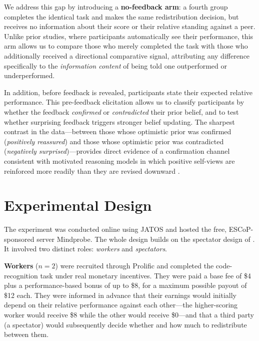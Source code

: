\documentclass[12pt]{article}
\begin{document}
We address this gap by introducing a \textbf{no-feedback arm}: a fourth
group completes the identical task and makes the same redistribution
decision, but receives no information about their score or their relative
standing against a peer.
Unlike prior studies, where participants automatically see their performance,
this arm allows us to compare those who merely completed the task with those
who additionally received a directional comparative signal, attributing any
difference specifically to the \emph{information content} of being told one
outperformed or underperformed.

In addition, before feedback is revealed, participants state their expected
relative performance.
This pre-feedback elicitation allows us to classify participants by whether
the feedback \emph{confirmed} or \emph{contradicted} their prior belief,
and to test whether surprising feedback triggers stronger belief updating.
The sharpest contrast in the data---between those whose optimistic prior was
confirmed (\emph{positively reassured}) and those whose optimistic prior was
contradicted (\emph{negatively surprised})---provides direct evidence of a
confirmation channel consistent with motivated reasoning models in which
positive self-views are reinforced more readily than they are revised
downward \citep{Benabou2006, Kunda1990}.

\section{Experimental Design}
\label{sec:design}

The experiment was conducted online using JATOS and hosted the free, ESCoP-sponsored server Mindprobe.
The whole design  builds on the spectator design of \citet{Almas2020}.
It involved two distinct roles: \emph{workers} and \emph{spectators}.

\textbf{Workers} ($n = 2$) were recruited through Prolific and completed the
code-recognition task under real monetary incentives.
They were paid a base fee of \$4 plus a performance-based bonus of up to \$8,
for a maximum possible payout of \$12 each.
They were informed in advance that their earnings would initially depend on
their relative performance against each other---the higher-scoring worker
would receive \$8 while the other would receive \$0---and that a third party
(a spectator) would subsequently decide whether and how much to redistribute
between them.
\end{document}
